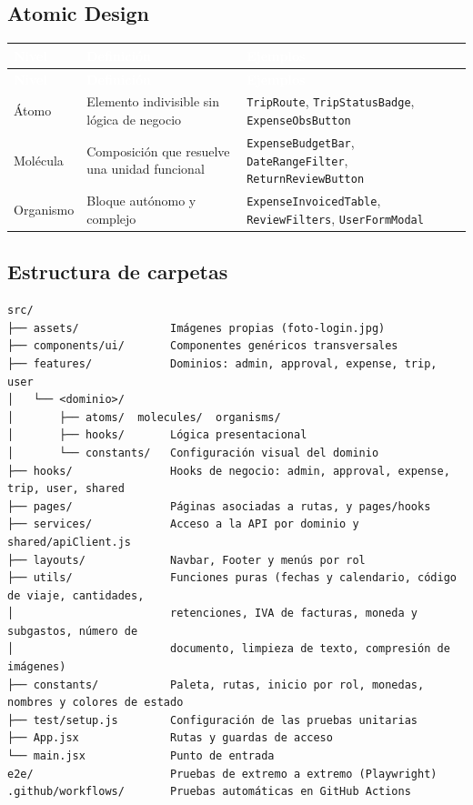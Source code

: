 \documentclass[11pt,letterpaper]{article}
\newcommand{\cabecera}{\rowcolor{maxamPrimario}}
\newcommand{\tth}[1]{\textcolor{white}{\textbf{#1}}}
\newcommand{\code}[1]{\nolinkurl{#1}}
\begin{document}
\subsection{Atomic Design}
\begin{xltabular}{\textwidth}{L{2.4cm} L{5.2cm} Y}
\cabecera \tth{Nivel} & \tth{Definición} & \tth{Ejemplos} \\
\endfirsthead
\cabecera \tth{Nivel} & \tth{Definición} & \tth{Ejemplos} \\
\endhead
{} Átomo & Elemento indivisible sin lógica de negocio & \code{TripRoute}, \code{TripStatusBadge}, \code{ExpenseObsButton} \\
Molécula & Composición que resuelve una unidad funcional & \code{ExpenseBudgetBar}, \code{DateRangeFilter}, \code{ReturnReviewButton} \\
 Organismo & Bloque autónomo y complejo & \code{ExpenseInvoicedTable}, \code{ReviewFilters}, \code{UserFormModal} \\
\end{xltabular}

\subsection{Estructura de carpetas}
\begin{lstlisting}
src/
├── assets/              Imágenes propias (foto-login.jpg)
├── components/ui/       Componentes genéricos transversales
├── features/            Dominios: admin, approval, expense, trip, user
│   └── <dominio>/
│       ├── atoms/  molecules/  organisms/
│       ├── hooks/       Lógica presentacional
│       └── constants/   Configuración visual del dominio
├── hooks/               Hooks de negocio: admin, approval, expense, trip, user, shared
├── pages/               Páginas asociadas a rutas, y pages/hooks
├── services/            Acceso a la API por dominio y shared/apiClient.js
├── layouts/             Navbar, Footer y menús por rol
├── utils/               Funciones puras (fechas y calendario, código de viaje, cantidades,
│                        retenciones, IVA de facturas, moneda y subgastos, número de
│                        documento, limpieza de texto, compresión de imágenes)
├── constants/           Paleta, rutas, inicio por rol, monedas, nombres y colores de estado
├── test/setup.js        Configuración de las pruebas unitarias
├── App.jsx              Rutas y guardas de acceso
└── main.jsx             Punto de entrada
e2e/                     Pruebas de extremo a extremo (Playwright)
.github/workflows/       Pruebas automáticas en GitHub Actions
\end{lstlisting}
\end{document}
